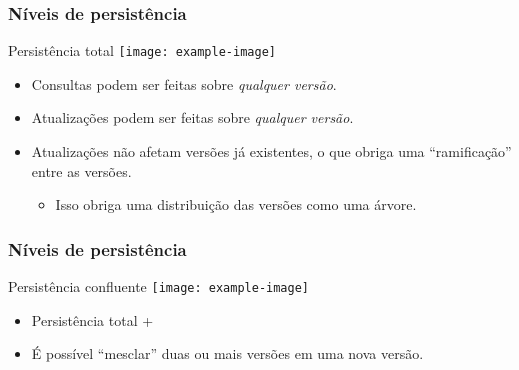 \documentclass[brazil]{beamer}
\begin{document}
    \begin{frame}
        \frametitle{Níveis de persistência}

        \begin{block}{Persistência total}
            \centering
            \texttt{[image: example-image]}
        \end{block}

        \begin{itemize}
            \item<1-> Consultas podem ser feitas sobre {\em qualquer versão}.
            \item<2-> Atualizações podem ser feitas sobre {\em qualquer versão}.
            \item<3-> Atualizações não afetam versões já existentes, o que obriga uma ``ramificação'' entre as versões.
            \begin{itemize}
                \item<4-> Isso obriga uma distribuição das versões como uma árvore.
            \end{itemize}
        \end{itemize}

    \end{frame}

    \begin{frame}
        \frametitle{Níveis de persistência}

        \begin{block}{Persistência confluente}
            \centering
            \texttt{[image: example-image]}
        \end{block}

        \begin{itemize}
            \item Persistência total +
            \item<2-> É possível ``mesclar'' duas ou mais versões em uma nova versão.
        \end{itemize}

    \end{frame}
\end{document}
